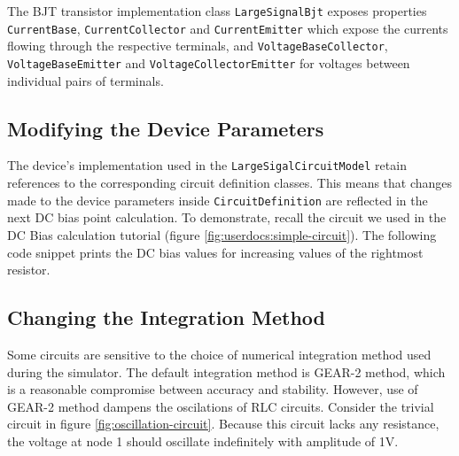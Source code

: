The BJT transistor implementation class \texttt{LargeSignalBjt} exposes properties \texttt{CurrentBase}, \texttt{CurrentCollector} and \texttt{CurrentEmitter} which expose the currents flowing through the respective terminals, and \texttt{VoltageBaseCollector}, \texttt{VoltageBaseEmitter} and \texttt{VoltageCollector\+Emitter} for voltages between individual pairs of terminals.

\subsection{Modifying the Device Parameters}
The device's implementation used in the \texttt{LargeSigalCircuitModel} retain references to the corresponding circuit definition classes. This means that changes made to the device parameters inside \texttt{CircuitDefinition} are reflected in the next DC bias point calculation. To demonstrate, recall the circuit we used in the DC Bias calculation tutorial (figure \ref{fig:userdocs:simple-circuit}). The following code snippet prints the DC bias values for increasing values of the rightmost resistor.


\subsection{Changing the Integration Method}
Some circuits are sensitive to the choice of numerical integration method used during the simulator. The default integration method is GEAR-2 method, which is a reasonable compromise between accuracy and stability. However, use of GEAR-2 method dampens the oscilations of RLC circuits. Consider the trivial circuit in figure \ref{fig:oscillation-circuit}. Because this circuit lacks any resistance, the voltage at node 1 should oscillate indefinitely with amplitude of 1V.


